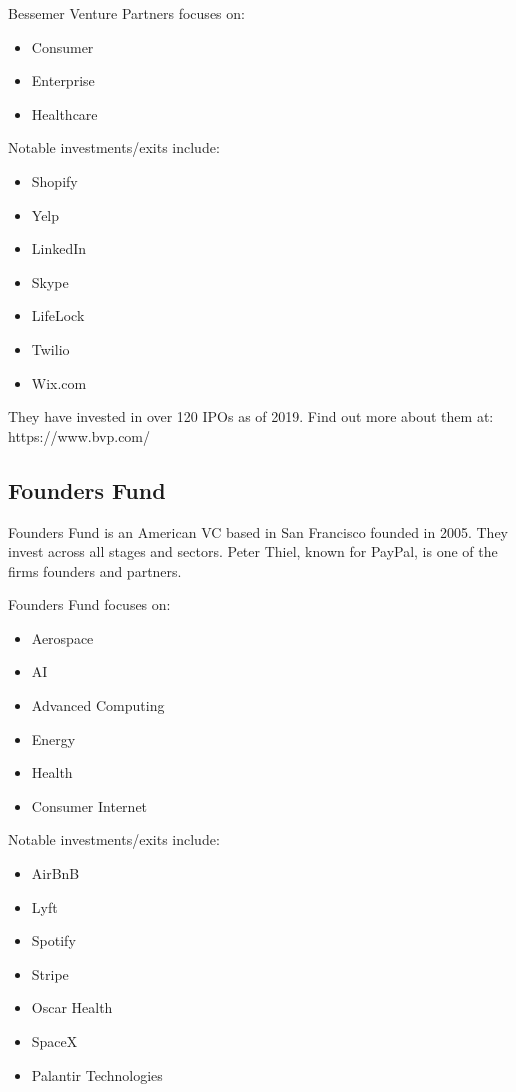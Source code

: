 \documentclass[a4paper]{article}
\begin{document}
{\vspace{5pt}
\noindent Bessemer Venture Partners focuses on:
\begin{itemize}
	\item Consumer
	\item Enterprise
	\item Healthcare
\end{itemize}

\vspace{5pt}
\noindent Notable investments/exits include:
\begin{itemize}
	\item Shopify
	\item Yelp
	\item LinkedIn
	\item Skype
	\item LifeLock
	\item Twilio
	\item Wix.com
\end{itemize}

\vspace{5pt}
\noindent They have invested in over 120 IPOs as of 2019. Find out more about them at: https://www.bvp.com/

\subsection{Founders Fund}
Founders Fund is an American VC based in San Francisco founded in 2005. They invest across all stages and sectors. Peter Thiel, known for PayPal, is one of the firms founders and partners.

\vspace{5pt}
\noindent Founders Fund focuses on:
\begin{itemize}
	\item Aerospace
	\item AI
	\item Advanced Computing
	\item Energy
	\item Health
	\item Consumer Internet
\end{itemize}

\vspace{5pt}
\noindent Notable investments/exits include:
\begin{itemize}
	\item AirBnB
	\item Lyft
	\item Spotify
	\item Stripe
	\item Oscar Health
	\item SpaceX
	\item Palantir Technologies
\end{itemize}

}
\end{document}
